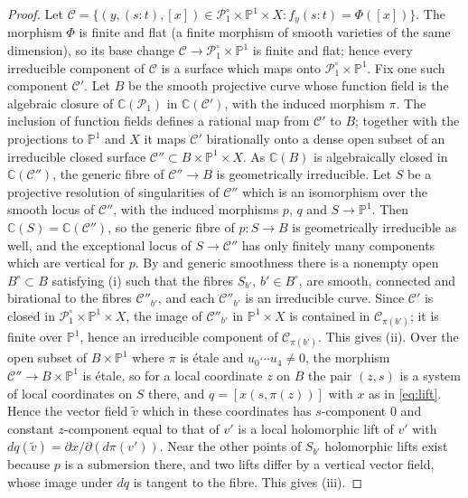 \documentclass[11pt]{amsart}
\theoremstyle{definition}
\theoremstyle{remark}
\numberwithin{equation}{section}
\newcommand{\C}{\mathbb{C}}
\newcommand{\PP}{\mathbb{P}}
\newcommand{\cP}{\mathcal{P}}
\newcommand{\cC}{\mathcal{C}}
\begin{document}
\begin{proof}
Let $\cC=\{(y,(s:t),[x])\in\cP_1^\circ\times\PP^1\times X:f_y(s:t)=\Phi([x])\}$. The morphism $\Phi$ is finite and flat (a finite morphism of smooth varieties of the same dimension), so its base change $\cC\to\cP_1^\circ\times\PP^1$ is finite and flat; hence every irreducible component of $\cC$ is a surface which maps onto $\cP_1^\circ\times\PP^1$. Fix one such component $\cC'$. Let $B$ be the smooth projective curve whose function field is the algebraic closure of $\C(\cP_1)$ in $\C(\cC')$, with the induced morphism $\pi$. The inclusion of function fields defines a rational map from $\cC'$ to $B$; together with the projections to $\PP^1$ and $X$ it maps $\cC'$ birationally onto a dense open subset of an irreducible closed surface $\cC''\subset B\times\PP^1\times X$. As $\C(B)$ is algebraically closed in $\C(\cC'')$, the generic fibre of $\cC''\to B$ is geometrically irreducible. Let $S$ be a projective resolution of singularities of $\cC''$ which is an isomorphism over the smooth locus of $\cC''$, with the induced morphisms $p$, $q$ and $S\to\PP^1$. Then $\C(S)=\C(\cC'')$, so the generic fibre of $p\colon S\to B$ is geometrically irreducible as well, and the exceptional locus of $S\to\cC''$ has only finitely many components which are vertical for $p$. By \cite[9.7.7]{EGA43} and generic smoothness \cite[III.10.7]{Ha77} there is a nonempty open $B^\circ\subset B$ satisfying (i) such that the fibres $S_{b'}$, $b'\in B^\circ$, are smooth, connected and birational to the fibres $\cC''_{b'}$, and each $\cC''_{b'}$ is an irreducible curve. Since $\cC'$ is closed in $\cP_1^\circ\times\PP^1\times X$, the image of $\cC''_{b'}$ in $\PP^1\times X$ is contained in $\cC_{\pi(b')}$; it is finite over $\PP^1$, hence an irreducible component of $\cC_{\pi(b')}$. This gives (ii). Over the open subset of $B\times\PP^1$ where $\pi$ is \'etale and $u_0\cdots u_4\ne0$, the morphism $\cC''\to B\times\PP^1$ is \'etale, so for a local coordinate $z$ on $B$ the pair $(z,s)$ is a system of local coordinates on $S$ there, and $q=[x(s,\pi(z))]$ with $x$ as in \eqref{eq:lift}. Hence the vector field $\tilde v$ which in these coordinates has $s$-component $0$ and constant $z$-component equal to that of $v'$ is a local holomorphic lift of $v'$ with $dq(\tilde v)=\partial x/\partial(d\pi(v'))$. Near the other points of $S_{b'}$ holomorphic lifts exist because $p$ is a submersion there, and two lifts differ by a vertical vector field, whose image under $dq$ is tangent to the fibre. This gives (iii).
\end{proof}
\end{document}
